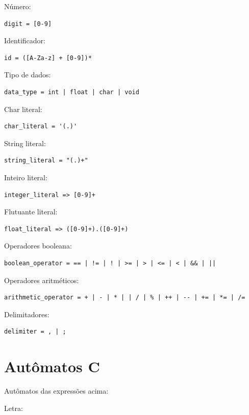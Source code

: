 \documentclass[]{article}
\numberwithin{equation}{section}
\begin{document}
Número:
\begin{lstlisting}
digit = [0-9]
\end{lstlisting}

Identificador:
\begin{lstlisting}
id = ([A-Za-z] + [0-9])*
\end{lstlisting}

Tipo de dados:
\begin{lstlisting}
data_type = int | float | char | void
\end{lstlisting}

Char literal:
\begin{lstlisting}
char_literal = '(.)'
\end{lstlisting}

String literal:
\begin{lstlisting}
string_literal = "(.)+"
\end{lstlisting}

Inteiro literal:
\begin{lstlisting}
integer_literal => [0-9]+
\end{lstlisting}

Flutuante literal:
\begin{lstlisting}
float_literal => ([0-9]+).([0-9]+)
\end{lstlisting}

Operadores booleana:
\begin{lstlisting}
boolean_operator = == | != | ! | >= | > | <= | < | && | ||
\end{lstlisting}

Operadores aritméticos:
\begin{lstlisting}
arithmetic_operator = + | - | * | | / | % | ++ | -- | += | *= | /=
\end{lstlisting}

Delimitadores:
\begin{lstlisting}
delimiter = , | ; 
\end{lstlisting}

\section{Autômatos C}
Autômatos das expressões acima:

Letra:
\begin{center}
\end{center}
\end{document}
